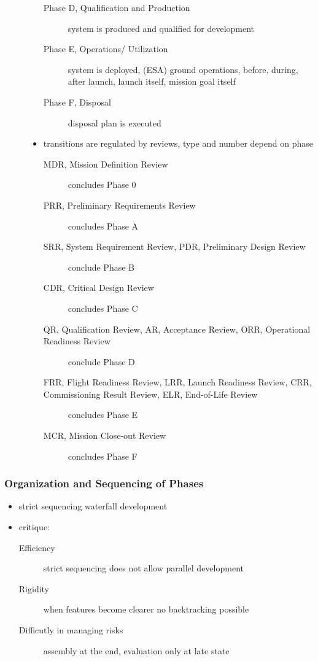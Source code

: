 \documentclass[a4paper, 10pt]{article}
\begin{document}
\begin{description}
\begin{itemize}
\begin{description}
            \item[Phase D, Qualification and Production] system is produced and qualified for development
            \item[Phase E, Operations/ Utilization] system is deployed, (ESA) ground operations, before, during, after launch, launch itself, mission goal itself
            \item[Phase F, Disposal] disposal plan is executed
        \end{description}
        \item transitions are regulated by reviews, type and number depend on phase
        \begin{description}
            \item[MDR, Mission Definition Review] concludes Phase 0
            \item[PRR, Preliminary Requirements Review] concludes Phase A
            \item[SRR, System Requirement Review, PDR, Preliminary Design Review] conclude Phase B
            \item[CDR, Critical Design Review] concludes Phase C
            \item[QR, Qualification Review, AR, Acceptance Review, ORR, Operational Readiness Review] conclude Phase D
            \item[FRR, Flight Readiness Review, LRR, Launch Readiness Review, CRR, Commissioning Result Review, ELR, End-of-Life Review] concludes Phase E
            \item[MCR, Mission Close-out Review] concludes Phase F
        \end{description}
    \end{itemize}
\end{description}

\subsubsection*{Organization and Sequencing of Phases}
\begin{itemize}
    \item strict sequencing \follows waterfall development
    \item critique:
    \begin{description}
        \item[Efficiency] strict sequencing does not allow parallel development
        \item[Rigidity] when features become clearer \follows no backtracking possible
        \item[Difficutly in managing risks] assembly at the end, evaluation only at late state
    \end{description}
\end{itemize}
\end{document}
